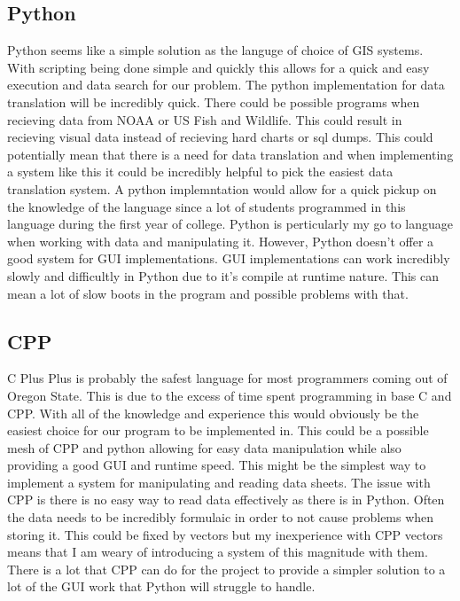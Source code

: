 \documentclass[onecolumn, draftclsnofoot,10pt, compsoc]{IEEEtran}
\begin{document}
      \subsection{Python}
      Python seems like a simple solution as the languge of choice of GIS systems. With scripting being done simple and quickly this allows for a quick and easy execution and data search for our problem. The python implementation for data translation will be incredibly quick. There could be possible programs when recieving data from NOAA or US Fish and Wildlife. This could result in recieving visual data instead of recieving hard charts or sql dumps. This could potentially mean that there is a need for data translation and when implementing a system like this it could be incredibly helpful to pick the easiest data translation system. A python implemntation would allow for a quick pickup on the knowledge of the language since a lot of students programmed in this language during the first year of college. Python is perticularly my go to language when working with data and manipulating it. However, Python doesn't offer a good system for GUI implementations. GUI implementations can work incredibly slowly and difficultly in Python due to it's compile at runtime nature. This can mean a lot of slow boots in the program and possible problems with that.
      \subsection{CPP}
      C Plus Plus is probably the safest language for most programmers coming out of Oregon State. This is due to the excess of time spent programming in base C and CPP. With all of the knowledge and experience this would obviously be the easiest choice for our program to be implemented in. This could be a possible mesh of CPP and python allowing for easy data manipulation while also providing a good GUI and runtime speed. This might be the simplest way to implement a system for manipulating and reading data sheets. The issue with CPP is there is no easy way to read data effectively as there is in Python. Often the data needs to be incredibly formulaic in order to not cause problems when storing it. This could be fixed by vectors but my inexperience with CPP vectors means that I am weary of introducing a system of this magnitude with them. There is a lot that CPP can do for the project to provide a simpler solution to a lot of the GUI work that Python will struggle to handle.
\end{document}
